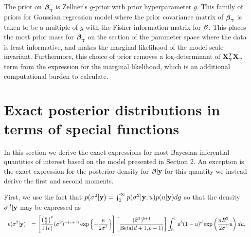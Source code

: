 The prior on ${\boldsymbol \beta}_{\boldsymbol \gamma}$ is Zellner's $g$-prior \citep[see for example,][]{Zellner1986} with prior 
hyperparameter $g$. This family of priors for Gaussian regression model where the prior covariance 
matrix of ${\boldsymbol \beta}_{\boldsymbol \gamma}$ is taken to be a multiple of $g$ with the Fisher information matrix for ${\boldsymbol \beta}$. 
This places the most prior mass for ${\boldsymbol \beta}_{\boldsymbol \gamma}$ on the section of the parameter space where the data is 
least informative, and makes the marginal likelihood of the model scale-invariant. Furthermore, this 
choice of prior removes a log-determinant of ${\bf X}_{\boldsymbol \gamma}^T{\bf X}_{\boldsymbol \gamma}$ term from the expression for the marginal 
likelihood, which is an additional computational burden to calculate.

\section{Exact posterior distributions in terms of special functions}
\label{sec:Exact}
 
In this section we derive the exact expressions for most Bayesian inferential quantities
of interest based on the model presented in Section 2. An exception is
the exact expression for the posterior density for ${\boldsymbol \beta}|{\bf y}$ for this quantity we
instead derive the first and second moments.


First, we use the fact that $p(\sigma^2|{\bf y}) = \int_0^\infty p(\sigma^2|{\bf y},u) p(u|{\bf y})dg$ so that the density
$\sigma^2|{\bf y}$ may be expressed as
$$
\begin{array}{rl}
\displaystyle p(\sigma^2|{\bf y}) 
& \displaystyle = 
\left[ \frac{\left(\tfrac{n}{2}\right)^c}{\Gamma(c)} (\sigma^2)^{-(c+1)} \exp\left\{ - \frac{n}{2\sigma^2} \right\} \right] 
\left[ \frac{(\widehat{\sigma}^2)^{b+1} }{\mbox{Beta}(d + 1,b+1)} \right]
\int_0^1
u^{b} (1 - u)^d  \exp\left(  \frac{nR^2}{2\sigma^2} u \right) du.
\end{array}
$$

%
%

